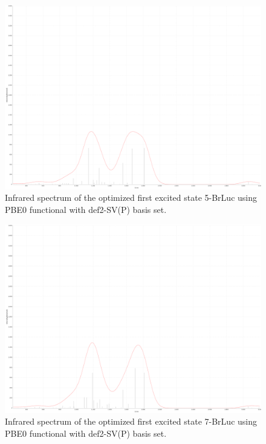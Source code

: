 \documentclass[11pt]{article}
\begin{document}
\begin{figure}[H]
  \centering
  \includegraphics[scale=0.13]{ir_ex1_5_brluc.png}
  \caption{Infrared spectrum of the optimized first excited
    state 5-BrLuc using PBE0 functional with def2-SV(P) basis set.}
\end{figure}

\begin{figure}[H]
  \centering
  \includegraphics[scale=0.13]{ir_ex1_7_brluc.png}
  \caption{Infrared spectrum of the optimized first excited
    state 7-BrLuc using PBE0 functional with def2-SV(P) basis set.}
\end{figure}
\end{document}
